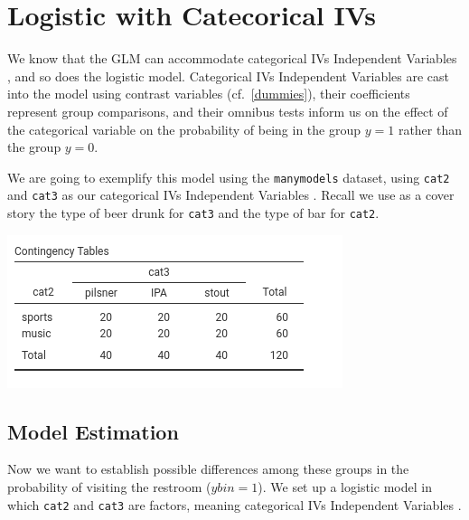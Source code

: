 \documentclass[
]{book}
\begin{document}
\hypertarget{gzlmanova}{%
\section{Logistic with Catecorical IVs}\label{gzlmanova}}

We know that the GLM can accommodate categorical {IVs {Independent Variables} }, and so does the logistic model. Categorical {IVs {Independent Variables} } are cast into the model using contrast variables (cf.~\ref{dummies}), their coefficients represent group comparisons, and their omnibus tests inform us on the effect of the categorical variable on the probability of being in the group \(y=1\) rather than the group \(y=0\).

We are going to exemplify this model using the \texttt{manymodels} dataset, using \texttt{cat2} and \texttt{cat3} as our categorical {IVs {Independent Variables} }. Recall we use as a cover story the type of beer drunk for \texttt{cat3} and the type of bar for \texttt{cat2}.

\includegraphics{bookletpics/3_logistic_output6.png}

\hypertarget{model-estimation}{%
\subsection{Model Estimation}\label{model-estimation}}

Now we want to establish possible differences among these groups in the probability of visiting the restroom (\(ybin=1\)). We set up a logistic model in which \texttt{cat2} and \texttt{cat3} are factors, meaning categorical {IVs {Independent Variables} }.
\end{document}

